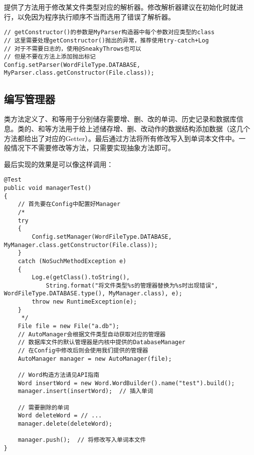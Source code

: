 提供了方法用于修改某文件类型对应的解析器。修改解析器建议在初始化时就进行，以免因为程序执行顺序不当而选用了错误了解析器。

\begin{lstlisting}[style=Java, caption={修改解析器},label={lst:修改解析器}]
// getConstructor()的参数是MyParser构造器中每个参数对应类型的class
// 这里需要处理getConstructor()抛出的异常，推荐使用try-catch+Log
// 对于不需要日志的，使用@SneakyThrows也可以
// 但是不要在方法上添加抛出标记
Config.setParser(WordFileType.DATABASE, MyParser.class.getConstructor(File.class));
\end{lstlisting}

\subsection[管理器]{编写管理器}\label{subsec:管理器}

类方法定义了、和等用于分别储存需要增、删、改的单词、历史记录和数据库信息。类的、和等方法用于给上述储存增、删、改动作的数据结构添加数据（这几个方法都给出了对应的Getter）。最后通过方法将所有修改写入到单词本文件中。一般情况下不需要修改等方法，只需要实现抽象方法即可。

最后实现的效果是可以像这样调用：

\begin{lstlisting}[style=Java, caption={示例},label={lst:Manager示例}]
@Test
public void managerTest()
{
    // 首先要在Config中配置好Manager
    /*
    try
    {
        Config.setManager(WordFileType.DATABASE, MyManager.class.getConstructor(File.class));
    }
    catch (NoSuchMethodException e)
    {
        Log.e(getClass().toString(),
            String.format("将文件类型%s的管理器替换为%s时出现错误", WordFileType.DATABASE.type(), MyManager.class), e);
        throw new RuntimeException(e);
    }
     */
    File file = new File("a.db");
    // AutoManager会根据文件类型自动获取对应的管理器
    // 数据库文件的默认管理器是内核中提供的DatabaseManager
    // 在Config中修改后则会使用我们提供的管理器
    AutoManager manager = new AutoManager(file);

    // Word构造方法请见API指南
    Word insertWord = new Word.WordBuilder().name("test").build();
    manager.insert(insertWord);  // 插入单词

    // 需要删除的单词
    Word deleteWord = // ...
    manager.delete(deleteWord);

    manager.push();  // 将修改写入单词本文件
}
\end{lstlisting}

